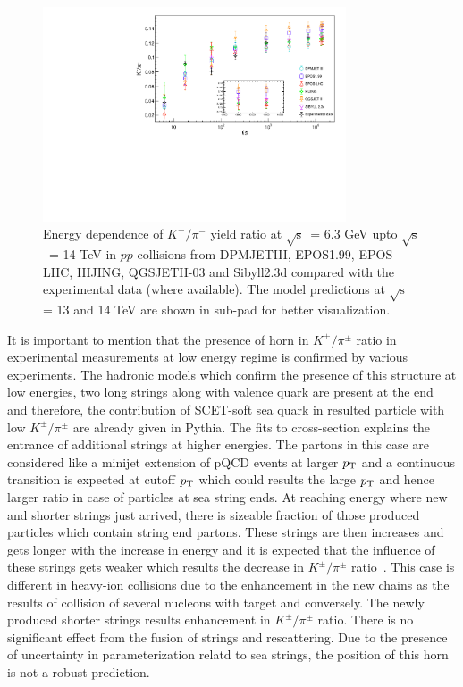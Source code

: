 \documentclass{article}
\newcommand{\sqrts}{\mbox{$\sqrt{\mathrm{s}}$}}
\newcommand{\ppt}{$p_{\rm T}$}
\begin{document}
\begin{figure}[ht!]
\begin{center}
\includegraphics[width=0.8\textwidth]{new_k-_pi-.pdf}
\caption{ Energy dependence of $K^-/\pi^-$ yield ratio at \sqrts~= 6.3 GeV upto \sqrts~= 14 TeV in $pp$ collisions from DPMJETIII, EPOS1.99, EPOS-LHC, HIJING, QGSJETII-03 and Sibyll2.3d compared with the experimental data (where available). The model predictions at \sqrts~ = 13 and 14 TeV are shown in sub-pad for better visualization.}

\label{fig2}
\end{center}
\end{figure}


It is important to mention that the presence of horn in $K^\pm/\pi^\pm$ ratio in experimental measurements at low energy regime is confirmed by various experiments. The hadronic models which confirm the presence of this structure at low energies, two long strings along with valence quark are present at the end and therefore, the contribution of SCET-soft sea quark in resulted particle with low $K^\pm/\pi^\pm$ are already given in Pythia. The fits to cross-section explains the entrance of additional strings at higher energies. The partons in this case are considered like a minijet extension of pQCD events at larger {\ppt} and a continuous transition is expected at cutoff {\ppt} which could results the large {\ppt} and hence larger ratio in case of particles at sea string ends. At reaching energy where new and shorter strings just arrived, there is sizeable fraction of those produced particles which contain string end partons. These strings are then increases and gets longer with the increase in energy and it is expected that the influence of these strings gets weaker which results the decrease in $K^\pm/\pi^\pm$ ratio~\cite{Bhattacharyya:2017rmc}. This case is different in heavy-ion collisions due to the enhancement in the new chains as the results of collision of several nucleons with target and conversely. The newly produced shorter strings results enhancement in $K^\pm/\pi^\pm$ ratio. There is no significant effect from the fusion of strings and rescattering. Due to the presence of uncertainty in parameterization relatd to sea strings, the position of this horn is not a robust prediction.  
\end{document}
